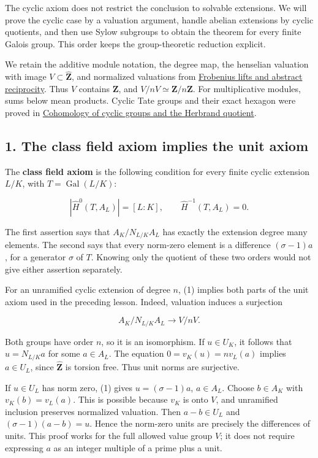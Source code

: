 \documentclass[11pt,a4paper]{article}
\begin{document}
The cyclic axiom does not restrict the conclusion to solvable
extensions. We will prove the cyclic case by a valuation argument,
handle abelian extensions by cyclic quotients, and then use Sylow
subgroups to obtain the theorem for every finite Galois group. This
order keeps the group-theoretic reduction explicit.

We retain the additive module notation, the degree map, the henselian
valuation with image \(V\subset\widehat{\mathbf Z}\), and normalized
valuations from
\href{../frobenius-lifts-and-abstract-reciprocity.html}{Frobenius lifts
and abstract reciprocity}. Thus \(V\) contains \(\mathbf Z\), and
\(V/nV\simeq\mathbf Z/n\mathbf Z\). For multiplicative modules, sums
below mean products. Cyclic Tate groups and their exact hexagon were
proved in
\href{../cohomology-of-cyclic-groups-and-the-herbrand-quotient.html}{Cohomology
of cyclic groups and the Herbrand quotient}.

\subsection{1. The class field axiom implies the unit
axiom}\label{the-class-field-axiom-implies-the-unit-axiom}

The \textbf{class field axiom} is the following condition for every
finite cyclic extension \(L/K\), with \(T=\operatorname{Gal}(L/K)\):

\[
|\widehat H^0(T,A_L)|=[L:K],\qquad
\widehat H^{-1}(T,A_L)=0.
\tag{1}
\]

The first assertion says that \(A_K/N_{L/K}A_L\) has exactly the
extension degree many elements. The second says that every norm-zero
element is a difference \((\sigma-1)a\), for a generator \(\sigma\) of
\(T\). Knowing only the quotient of these two orders would not give
either assertion separately.

For an unramified cyclic extension of degree \(n\), (1) implies both
parts of the unit axiom used in the preceding lesson. Indeed, valuation
induces a surjection

\[
A_K/N_{L/K}A_L\longrightarrow V/nV.
\]

Both groups have order \(n\), so it is an isomorphism. If \(u\in U_K\),
it follows that \(u=N_{L/K}a\) for some \(a\in A_L\). The equation
\(0=v_K(u)=n v_L(a)\) implies \(a\in U_L\), since
\(\widehat{\mathbf Z}\) is torsion free. Thus unit norms are surjective.

If \(u\in U_L\) has norm zero, (1) gives \(u=(\sigma-1)a\),
\(a\in A_L\). Choose \(b\in A_K\) with \(v_K(b)=v_L(a)\). This is
possible because \(v_K\) is onto \(V\), and unramified inclusion
preserves normalized valuation. Then \(a-b\in U_L\) and
\((\sigma-1)(a-b)=u\). Hence the norm-zero units are precisely the
differences of units. This proof works for the full allowed value group
\(V\); it does not require expressing \(a\) as an integer multiple of a
prime plus a unit.
\end{document}
